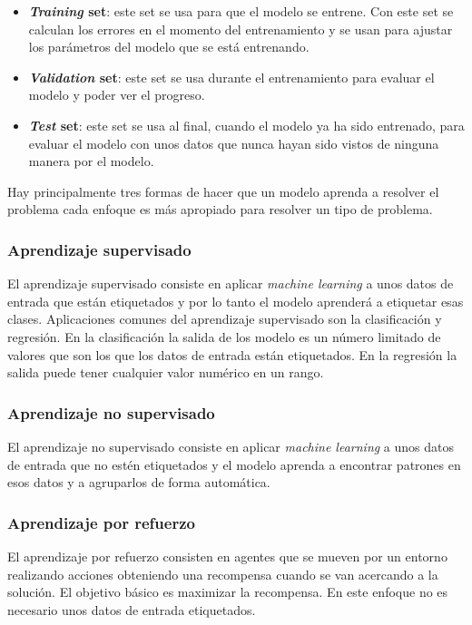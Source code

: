 \documentclass[12pt,a4paper]{article}
\begin{document}
\begin{itemize}
\item \textbf{\textit{Training} set}: este set se usa para que el modelo se entrene. Con este set se calculan los errores en el momento del entrenamiento y se usan para ajustar los parámetros del modelo que se está entrenando.
\item \textbf{\textit{Validation} set}: este set se usa durante el entrenamiento para evaluar el modelo y poder ver el progreso.
\item \textbf{\textit{Test} set}: este set se usa al final, cuando el modelo ya ha sido entrenado, para evaluar el modelo con unos datos que nunca hayan sido vistos de ninguna manera por el modelo.
\end{itemize}

Hay principalmente tres formas de hacer que un modelo aprenda a resolver el problema cada enfoque es más apropiado para resolver un tipo de problema.

\subsubsection{Aprendizaje supervisado}
El aprendizaje supervisado consiste en aplicar \textit{machine learning} a unos datos de entrada que están etiquetados y por lo tanto el modelo aprenderá a etiquetar esas clases. Aplicaciones comunes del aprendizaje supervisado son la clasificación y regresión. En la clasificación la salida de los modelo es un número limitado de valores que son los que los datos de entrada están etiquetados. En la regresión la salida puede tener cualquier valor numérico en un rango.

\subsubsection{Aprendizaje no supervisado}
El aprendizaje no supervisado consiste en aplicar \textit{machine learning} a unos datos de entrada que no estén etiquetados y el modelo aprenda a encontrar patrones en esos datos y a agruparlos de forma automática.

\subsubsection{Aprendizaje por refuerzo}
El aprendizaje por refuerzo consisten en agentes que se mueven por un entorno realizando acciones obteniendo una recompensa cuando se van acercando a la solución. El objetivo básico es maximizar la recompensa. En este enfoque no es necesario unos datos de entrada etiquetados.
\end{document}
